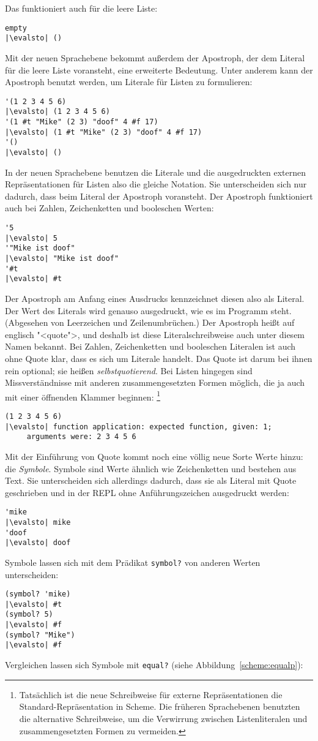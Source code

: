 Das funktioniert auch für die leere Liste:
%
\begin{lstlisting}
empty
|\evalsto| ()
\end{lstlisting}
%
Mit der neuen Sprachebene bekommt außerdem der Apostroph, der dem
Literal für die leere Liste voransteht, eine erweiterte Bedeutung.
Unter anderem kann der Apostroph benutzt werden, um Literale für
Listen zu formulieren:
%
\begin{lstlisting}
'(1 2 3 4 5 6)
|\evalsto| (1 2 3 4 5 6)
'(1 #t "Mike" (2 3) "doof" 4 #f 17)
|\evalsto| (1 #t "Mike" (2 3) "doof" 4 #f 17)
'()
|\evalsto| ()
\end{lstlisting}
%
In der neuen Sprachebene benutzen die Literale und die ausgedruckten
externen Repräsentationen für Listen also die gleiche
Notation.  Sie unterscheiden sich nur dadurch,
dass beim Literal der Apostroph voransteht.  Der Apostroph funktioniert
auch bei Zahlen, Zeichenketten und booleschen Werten:
%
\begin{lstlisting}
'5
|\evalsto| 5
'"Mike ist doof"
|\evalsto| "Mike ist doof"
'#t
|\evalsto| #t
\end{lstlisting}
%
Der Apostroph am Anfang eines Ausdrucks
kennzeichnet diesen also als Literal.  Der Wert des Literals wird 
genauso ausgedruckt, wie es im Programm steht.  (Abgesehen von
Leerzeichen und Zeilenumbrüchen.)  Der Apostroph heißt auf englisch
"<quote">, und deshalb ist diese
Literalschreibweise auch unter diesem Namen bekannt.  Bei Zahlen,
Zeichenketten und booleschen Literalen ist auch ohne Quote klar, dass
es sich um Literale handelt.  Das Quote ist darum bei ihnen rein
optional; sie heißen 
\textit{selbstquotierend}.
Bei Listen hingegen sind Missverständnisse mit anderen
zusammengesetzten Formen möglich, die ja auch mit einer öffnenden Klammer
beginnen: \footnote{Tatsächlich ist die neue Schreibweise für externe
  Repräsentationen die Standard-Repräsentation in Scheme.  Die
  früheren Sprachebenen benutzten die alternative Schreibweise, um die
  Verwirrung zwischen Listenliteralen und zusammengesetzten Formen zu
  vermeiden.}
\begin{lstlisting}
(1 2 3 4 5 6)
|\evalsto| function application: expected function, given: 1;
     arguments were: 2 3 4 5 6
\end{lstlisting}
%
Mit der Einführung von Quote kommt noch eine völlig neue Sorte Werte
hinzu: die \textit{Symbole}.  Symbole sind Werte ähnlich wie Zeichenketten und
bestehen aus Text.  Sie unterscheiden sich allerdings dadurch, dass sie
als Literal mit Quote geschrieben und in der REPL ohne
Anführungszeichen ausgedruckt werden:
%
\begin{lstlisting}
'mike
|\evalsto| mike
'doof
|\evalsto| doof
\end{lstlisting}
%
Symbole lassen sich mit dem Prädikat
\lstinline{symbol?} von anderen Werten
unterscheiden:
%
\begin{lstlisting}
(symbol? 'mike)
|\evalsto| #t
(symbol? 5)
|\evalsto| #f
(symbol? "Mike")
|\evalsto| #f
\end{lstlisting}
%
Vergleichen lassen sich Symbole mit \lstinline{equal?} (siehe
Abbildung~\ref{scheme:equalp}):

